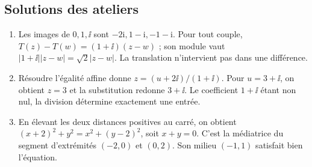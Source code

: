 \subsection{Solutions des ateliers}
\begin{enumerate}
\item Les images de $0,1,\ii$ sont $- 2 \mathrm{i}, 1 - \mathrm{i}, -1 - \mathrm{i}$. Pour tout couple, $T(z)-T(w)=(1+\ii)(z-w)$ ; son module vaut $|1+\ii||z-w|=\sqrt2|z-w|$. La translation n'intervient pas dans une différence.
\item Résoudre l'égalité affine donne $z=(u+2\ii)/(1+\ii)$. Pour $u=3+\ii$, on obtient $z=3$ et la substitution redonne $3+\ii$. Le coefficient $1+\ii$ étant non nul, la division détermine exactement une entrée.
\item En élevant les deux distances positives au carré, on obtient $(x+2)^2+y^2=x^2+(y-2)^2$, soit $x+y=0$. C'est la médiatrice du segment d'extrémités $(-2,0)$ et $(0,2)$. Son milieu $(-1,1)$ satisfait bien l'équation.
\end{enumerate}
